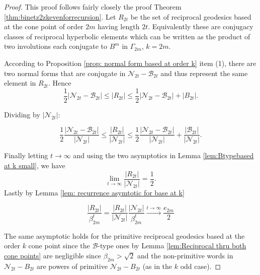 \documentclass[11pt]{amsart}
\numberwithin{equation}{section}
\theoremstyle{plain}
\begin{document}
\begin{proof}
This proof follows fairly closely the proof  Theorem \ref{thm:binetz2zkevenforrecursion}.
Let $R_{2t}$ be the set of reciprocal geodesics based at the cone point of order $2m$  having  length $2t$.
Equivalently these are conjugacy classes of  reciprocal hyperbolic elements  which can be written as the product of two involutions each conjugate to $B^{m}$ in $\Gamma_{2m}$, $k=2m$. 

According to  Proposition \ref{prop: normal form based at order k} item (1),  there are two   normal forms that are conjugate  in 
$\mathcal{N}_{2t}-\mathcal{B}_{2t}$ and thus  represent the same element in $R_{2t}$.
Hence
\begin{equation}\label{eqn:conjclass}
\frac{1}{2}|\mathcal{N}_{2t}-\mathcal{B}_{2t}| \leq |R_{2t}| \leq \frac{1}{2}|\mathcal{N}_{2t}-\mathcal{B}_{2t}|+|B_{2t}|.\end{equation}


Dividing  by $|\mathcal{N}_{2t}|$:

\[\frac{1}{2}\frac{|\mathcal{N}_{2t}-\mathcal{B}_{2t}|}{|\mathcal{N}_{2t}|}\leq
\frac{|R_{2t}|}{|\mathcal{N}_{2t}|}\leq \frac{1}{2}\frac{|\mathcal{N}_{2t}-\mathcal{B}_{2t}|}{|\mathcal{N}_{2t}|}+\frac{|\mathcal{B}_{2t}|}{|\mathcal{N}_{2t}|}.\]

Finally letting  $t\to\infty$ and using  the two asymptotics in Lemma  
\ref{lem:Btypebased at k small}, we have \[\displaystyle\lim_{t\to\infty}\frac{|R_{2t}|}{|\mathcal{N}_{2t}|}=\frac{1}{2}.\]
Lastly by  Lemma \ref{lem: recurrence asymtotic for base at k}

 \begin{equation}
\frac{|R_{2t}|}{\beta_{2m}^{t}}=\frac{|R_{2t}|}{|\mathcal{N}_{2t}|}
\frac{|\mathcal{N}_{2t}|}{\beta_{2m}^{t}}
\xrightarrow{t\to\infty} \frac{e_{2m}}{2}
\end{equation}

The same asymptotic  holds for the primitive reciprocal geodesics based at the order $k$  cone point since the $\mathcal{B}$-type ones by Lemma \ref{lem:Reciprocal thru both cone points} 
 are negligible since $\beta_{2m} >\sqrt{2}$ and the non-primitive  words in $\mathcal{N}_{2t}-B_{2t}$ are powers of primitive
  $\mathcal{N}_{2t}-B_{2t}$ (as in the $k$ odd case).
\end{proof}





 
\end{document}
